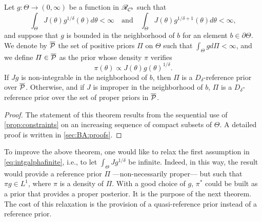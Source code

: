 \begin{thm}\label{thm:lintoproper}
    Let $g:\Theta\to(0,\infty)$ be a function in $\mathscr{R}_{\mathcal{C}^b}$ such that
        \begin{equation}\label{eq:intgalphafinite}
            \int_\Theta J(\theta)g^{1/\delta}(\theta)d\theta<\infty \quad\text{and}
            \quad\int_\Theta J(\theta)g^{1/\delta+1}(\theta)d\theta<\infty,
        \end{equation}
    and suppose that $g$ is bounded in the neighborhood of $b$ for an element $b\in\partial\Theta$. %
    We denote by $\overline{\mathcal{P}}$ the set of positive priors $\varPi$ on $\Theta$ such that $\int_\Theta gd\varPi<\infty$, and we define 
    $\varPi\in\overline{\mathcal{P}}$ as the prior whose density $\pi$ verifies %
        \begin{equation}
            \pi(\theta)\propto J(\theta)g(\theta)^{1/\delta}.
        \end{equation}
    If $Jg$ is non-integrable in the neighborhood of $b$, then $\varPi$ is a $D_\delta$-reference prior over $\overline{\mathcal{P}}$. Otherwise, and if $J$ is improper in the neighborhood of $b$, $\varPi$ is a $D_\delta$-reference prior over the set of proper priors in $\overline{\mathcal{P}}$.
\end{thm}

\begin{proof}
    The statement of this theorem results from the sequential use of \cref{prop:constraints} on an increasing sequence of compact subsets of $\Theta$. A detailed proof is written in \cref{sec:BA:proofs}.     
\end{proof}


   To improve the above theorem, one would like 
     to relax the first assumption in \cref{eq:intgalphafinite}, i.e., to let $\int_\Theta J g^{1/\delta}$  be infinite. Indeed, in this way, the result would provide a reference prior $\varPi$ ---non-necessarily proper--- but such that $\pi g\in L^1$, where $\pi$ is a density of $\varPi$. With a good choice of $g$, $\pi^\ast$ could be built as a prior that provides a proper posterior. It is the purpose of the next theorem. 
    The cost of this relaxation is the provision of a quasi-reference prior instead of a reference prior.

